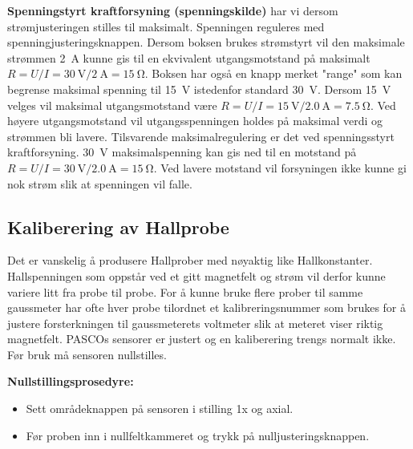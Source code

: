 \documentclass[../Elmag-labhefte-2020.tex]{subfiles}
\begin{document}
\begin{itemize}
    \textbf{Spenningstyrt kraftforsyning (spenningskilde)} har vi dersom strømjusteringen stilles til maksimalt. Spenningen reguleres med spenningjusteringsknappen. 
    Dersom boksen brukes strømstyrt vil den maksimale strømmen \SI{2}{\ampere} kunne gis til en ekvivalent utgangsmotstand på maksimalt $R = U/I = \SI{30}{\volt} / \SI{2}{\ampere} = \SI{15}{\ohm}$. Boksen har også en knapp merket "range" som kan begrense maksimal spenning til \SI{15}{\volt} istedenfor standard \SI{30}{\volt}. Dersom \SI{15}{\volt} velges vil maksimal utgangsmotstand være $R = U/I = \SI{15}{\volt} / \SI{2,0}{\ampere} = \SI{7,5}{\ohm}$. Ved høyere utgangsmotstand vil utgangsspenningen holdes på maksimal verdi og strømmen bli lavere.
    Tilsvarende maksimalregulering er det ved spenningsstyrt kraftforsyning. \SI{30}{\volt} maksimalspenning kan gis ned til en motstand på $R = U/I = \SI{30}{\volt} / \SI{2,0}{\ampere} = \SI{15}{\ohm}$. Ved lavere motstand vil forsyningen ikke kunne gi nok strøm slik at spenningen vil falle.
\end{itemize}

\subsection{Kaliberering av Hallprobe}

Det er vanskelig å produsere Hallprober med nøyaktig like Hallkonstanter. Hallspenningen som oppstår ved et gitt magnetfelt og strøm vil derfor kunne variere litt fra probe til probe. For å kunne bruke flere prober til samme gaussmeter har ofte hver probe tilordnet et kalibreringsnummer som brukes for å justere forsterkningen til gaussmeterets voltmeter slik at meteret viser riktig magnetfelt. PASCOs sensorer er justert og en kaliberering trengs normalt ikke. Før bruk må sensoren nullstilles. 

\textbf{Nullstillingsprosedyre:}
\vspace{-5mm}
\begin{itemize}
    \item Sett områdeknappen på sensoren i stilling 1x og axial.
    \item Før proben inn i nullfeltkammeret og trykk på nulljusteringsknappen.
\end{itemize}
\end{document}
